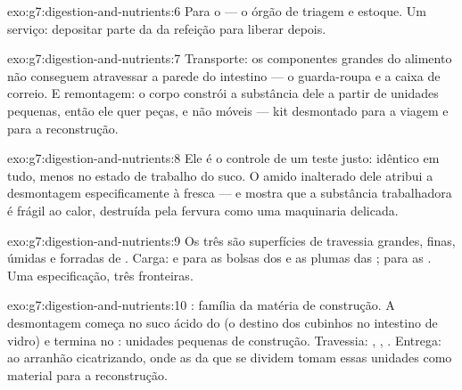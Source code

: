 \begin{solution}{exo:g7:digestion-and-nutrients:6}
Para o  --- o órgão de triagem e estoque. Um serviço: depositar
parte da  da refeição para liberar depois.
\end{solution}

\begin{solution}{exo:g7:digestion-and-nutrients:7}
Transporte: os componentes grandes do alimento não conseguem
atravessar a parede do intestino --- o guarda-roupa e a caixa de
correio. E remontagem: o corpo constrói a substância dele a partir de
unidades pequenas, então ele quer peças, e não móveis --- kit
desmontado para a viagem e para a reconstrução.
\end{solution}

\begin{solution}{exo:g7:digestion-and-nutrients:8}
Ele é o controle de um teste justo: idêntico em tudo, menos no estado
de trabalho do suco. O amido inalterado dele atribui a desmontagem
especificamente à  fresca --- e mostra que a substância
trabalhadora é frágil ao calor, destruída pela fervura como uma
maquinaria delicada.
\end{solution}

\begin{solution}{exo:g7:digestion-and-nutrients:9}
Os três são superfícies de travessia grandes, finas, úmidas e
forradas de . Carga:  e  para as bolsas dos
 e as plumas das ;  para as . Uma
especificação, três fronteiras.
\end{solution}

\begin{solution}{exo:g7:digestion-and-nutrients:10}
: família da matéria de construção. A desmontagem começa no suco
ácido do  (o destino dos cubinhos no intestino de vidro) e
termina no : unidades pequenas de construção.
Travessia: , , . Entrega: ao arranhão
cicatrizando, onde as  da  que se dividem tomam essas
unidades como material para a reconstrução.
\end{solution}

